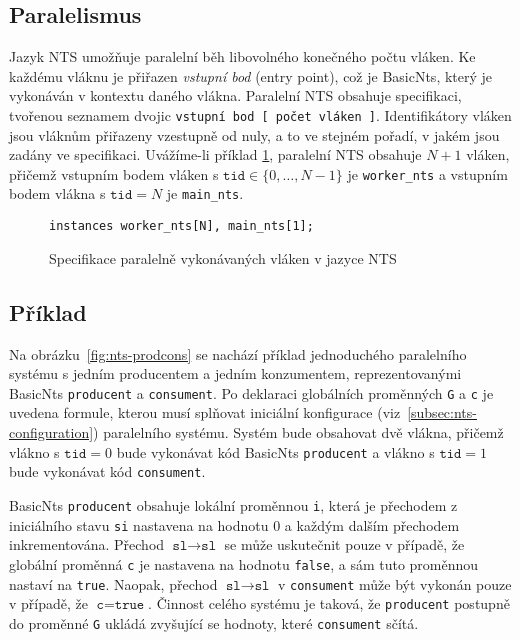 \documentclass[12pt]{fithesis2}
\begin{document}
\subsection{Paralelismus}
\label{subsec:nts-paralelism}
Jazyk NTS umožňuje paralelní běh libovolného konečného počtu vláken. Ke každému vláknu je přiřazen \textit{vstupní bod} (entry point), což je BasicNts, který je vykonáván v kontextu daného vlákna. Paralelní NTS obsahuje specifikaci, tvořenou seznamem dvojic \texttt{vstupní bod [ počet vláken ]}. Identifikátory vláken jsou vláknům přiřazeny vzestupně od nuly, a to ve stejném pořadí, v jakém jsou zadány ve specifikaci.  Uvážíme-li příklad \ref{fig:nts-instances}, paralelní NTS obsahuje $N+1$ vláken, přičemž vstupním bodem vláken s $\texttt{tid} \in \{ 0, \ldots, N - 1 \}$ je \texttt{worker\_nts} a vstupním bodem vlákna s $\texttt{tid} = N$ je \texttt{main\_nts}.

\begin{figure}[h!]
\begin{lstlisting}
instances worker_nts[N], main_nts[1];
\end{lstlisting}
\caption{Specifikace paralelně vykonávaných vláken v jazyce NTS}
\label{fig:nts-instances}
\end{figure}



\subsection{Příklad}
Na obrázku~\ref{fig:nts-prodcons} se nachází příklad jednoduchého paralelního systému s jedním producentem a jedním konzumentem, reprezentovanými BasicNts \texttt{producent} a \texttt{consument}. Po deklaraci globálních proměnných \texttt{G} a \texttt{c} je uvedena formule, kterou musí splňovat iniciální konfigurace  (viz~\ref{subsec:nts-configuration}) paralelního systému. Systém bude obsahovat dvě vlákna, přičemž vlákno s $\texttt{tid} = 0$ bude vykonávat kód BasicNts \texttt{producent} a vlákno s $\texttt{tid} = 1$ bude vykonávat kód \texttt{consument}.

BasicNts \texttt{producent} obsahuje lokální proměnnou \texttt{i}, která je přechodem z iniciálního stavu \texttt{si} nastavena na hodnotu $0$ a každým dalším přechodem inkrementována. Přechod $\texttt{sl} \rightarrow \texttt{sl}$ se může uskutečnit pouze v případě, že globální proměnná \texttt{c} je nastavena na  hodnotu \texttt{false}, a sám tuto proměnnou nastaví na \texttt{true}. Naopak, přechod $\texttt{sl} \rightarrow \texttt{sl}$ v \texttt{consument} může být vykonán pouze v případě, že $\texttt{c} = \texttt{true}$. Činnost celého systému je taková, že \texttt{producent} postupně do proměnné \texttt{G} ukládá zvyšující se hodnoty, které \texttt{consument} sčítá.
\end{document}
